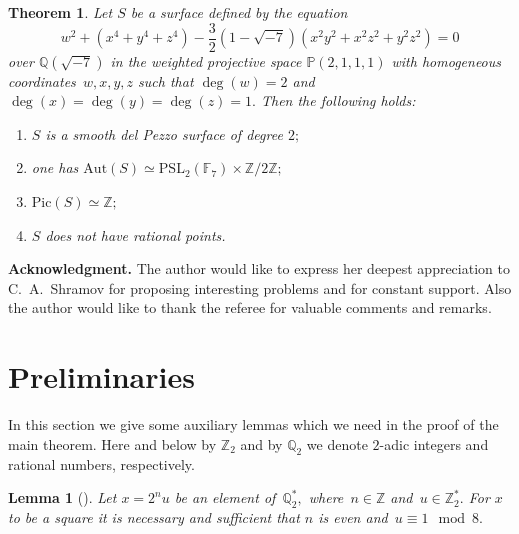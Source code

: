 \documentclass{amsart}
\makeatletter
\numberwithin{equation}{section}
\newtheorem{Th}[subsection]{Theorem}
\newtheorem{Lemma}[subsection]{Lemma}
\theoremstyle{definition}
\newcommand*{\rom}[1]{\expandafter\@slowromancap\romannumeral #1@}
\makeatother
\begin{document}
\begin{Th}\label{th:nopoints}
Let $S$ be a surface defined by the equation
$$
w^2+(x^4+y^4+z^4)-\frac{3}{2}(1-\sqrt{-7})(x^2y^2+x^2z^2+y^2z^2)=0
$$
\noindent over $\mathbb{Q}(\sqrt{-7})$ in the weighted projective space $\mathbb{P}(2,1,1,1)$ with  homogeneous coordinates~$w,x,y,z$ such that $\deg(w)=2$ and $\deg(x)=\deg(y)=\deg(z)=1.$ Then the following holds:
\begin{enumerate}
\renewcommand\labelenumi{\rm (\roman{enumi})}
\renewcommand\theenumi{\rm (\roman{enumi})}


\item\label{conditiondp2}
$S$ is a smooth del Pezzo surface of degree $2;$


\item\label{conditionAut}
one has $\mathrm{Aut}(S)\simeq \mathrm{PSL}_2(\mathbb{F}_7) \times \mathbb{Z}/2\mathbb{Z};$

\item\label{conditionPic}
$\mathrm{Pic}(S) \simeq \mathbb{Z};$

\item\label{conditionnopoint}
$S$ does not have rational points.



\end{enumerate}


\end{Th}






\textbf{Acknowledgment.} The author would like to express her deepest appreciation to C.~A.~Shramov for proposing interesting problems and for constant support. Also the author would like to thank the referee for valuable comments and remarks.







\section{Preliminaries}
In this section we give some auxiliary lemmas which we need in  the proof of the main theorem. Here and below by $\mathbb{Z}_2$ and by $\mathbb{Q}_2$ we denote $2$-adic integers and rational numbers, respectively.
 

\begin{Lemma}[{\cite[Chapter \rom{2}, Theorem 4]{Serrearithmetic}}]\label{lemma:Serremod2}
Let  $x=2^nu$ be an element of~$\mathbb{Q}_2^*,$ where~\mbox{$n \in \mathbb{Z}$} and~\mbox{$u \in \mathbb{Z}_2^*.$} For $x$ to be a square it is necessary and sufficient that $n$ is even and~\mbox{$u \equiv 1 \mod 8.$}
\end{Lemma}
\end{document}

